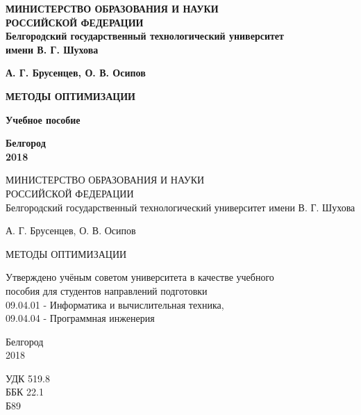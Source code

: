 \thispagestyle{empty}
\begin{center}
\textbf{МИНИСТЕРСТВО ОБРАЗОВАНИЯ И НАУКИ \\ РОССИЙСКОЙ ФЕДЕРАЦИИ \\
Белгородский государственный технологический университет \\ имени В. Г. Шухова}
\end{center}
\vspace{1.5cm}
\begin{center}
\large\textbf{{А. Г. Брусенцев, О. В. Осипов}}
\end{center}
\vspace{1.5cm}
\begin{center}
\large\textbf{{МЕТОДЫ ОПТИМИЗАЦИИ}}
\vspace{0.3cm}

\textbf{Учебное пособие}
\end{center}
\vspace{9.5cm}
\begin{center}
\textbf{Белгород \\
2018}
\end{center}
\newpage
\begin{center}
МИНИСТЕРСТВО ОБРАЗОВАНИЯ И НАУКИ \\ РОССИЙСКОЙ ФЕДЕРАЦИИ \\
Белгородский государственный технологический университет
имени В. Г. Шухова
\end{center}
\vspace{1.5cm}
\begin{center}
А. Г. Брусенцев, О. В. Осипов
\end{center}
\vspace{1cm}
\begin{center}
МЕТОДЫ ОПТИМИЗАЦИИ
\vspace{0.3cm}

\footnotesize{Утверждено учёным советом университета в качестве учебного \\ пособия для студентов направлений подготовки \\
09.04.01 - Информатика и вычислительная техника, \\ 09.04.04 - Программная инженерия}
\end{center}
\vspace{9cm}
\begin{center}
Белгород \\
2018
\end{center}
\newpage
\begin{flushleft}
УДК 519.8 \\
ББК 22.1 \\
Б89
\end{flushleft}
